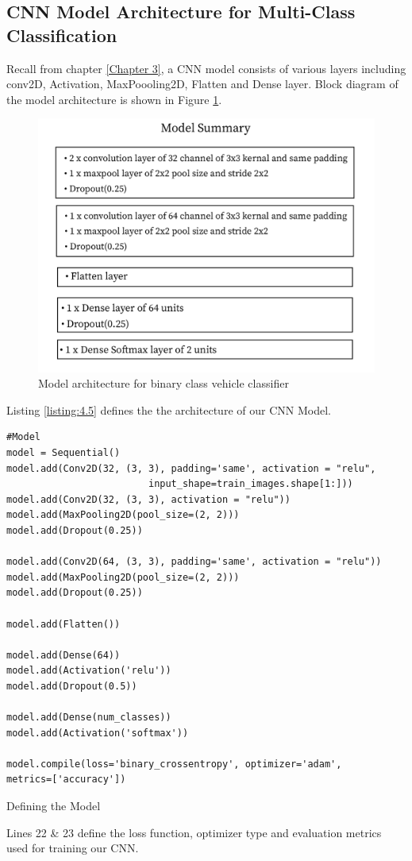 \subsection{CNN Model Architecture for Multi-Class Classification}
Recall from chapter \ref{Chapter 3}, a CNN model consists of various layers including
conv2D, Activation, MaxPoooling2D, Flatten and Dense layer.
Block diagram of the model architecture is shown in Figure \ref{fig:model_summary_2}. 
\begin{figure}[H]
    \centering
    \captionsetup{justification = centering}
    \includegraphics[scale = 1]{CHAPTERS/Chapter-4/Images/model_summary_2}
    \caption{Model architecture for binary class vehicle classifier} 
    \label{fig:model_summary_2}
\end{figure}
\noindent Listing \ref{listing:4.5}
defines the the architecture of our CNN Model.
\begin{longlisting}
    \begin{verbatim}
#Model
model = Sequential()
model.add(Conv2D(32, (3, 3), padding='same', activation = "relu",
                         input_shape=train_images.shape[1:]))
model.add(Conv2D(32, (3, 3), activation = "relu"))
model.add(MaxPooling2D(pool_size=(2, 2)))
model.add(Dropout(0.25))   

model.add(Conv2D(64, (3, 3), padding='same', activation = "relu"))
model.add(MaxPooling2D(pool_size=(2, 2)))
model.add(Dropout(0.25)) 
     
model.add(Flatten())

model.add(Dense(64))
model.add(Activation('relu'))
model.add(Dropout(0.5)) 

model.add(Dense(num_classes))
model.add(Activation('softmax'))

model.compile(loss='binary_crossentropy', optimizer='adam',
metrics=['accuracy'])
    \end{verbatim}
    \caption{Defining the Model}
\label{listing:4.5}
\end{longlisting}
\noindent Lines 22 \& 23 define the loss function,
optimizer type and evaluation metrics used for training our CNN.
